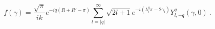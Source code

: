 \begin{equation}
\label{f}
f(\gamma)=\frac{\sqrt{\pi}}{ik}e^{-iq(R+R'-\pi)}\sum_{l=|q|}^\infty
\sqrt{2l+1}e^{-i(\lambda_l^q\pi-2\gamma_l)}Y_{l,-q}^q(\gamma,0) \ .
\end{equation}

